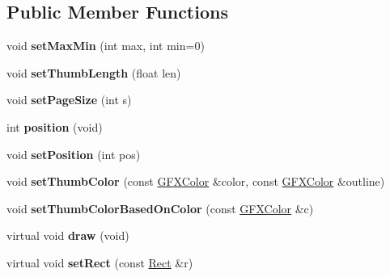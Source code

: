 \subsection*{Public Member Functions}
\begin{DoxyCompactItemize}
\item 
void {\bfseries set\+Max\+Min} (int max, int min=0)\hypertarget{classSlider_a3dc7c04fc2a84a6147ce0a4eaf4a548e}{}\label{classSlider_a3dc7c04fc2a84a6147ce0a4eaf4a548e}

\item 
void {\bfseries set\+Thumb\+Length} (float len)\hypertarget{classSlider_a3c8449732a5e30e1a00ff884ab9ccfa0}{}\label{classSlider_a3c8449732a5e30e1a00ff884ab9ccfa0}

\item 
void {\bfseries set\+Page\+Size} (int s)\hypertarget{classSlider_a35154f532e345746c99298fa19f9b0a2}{}\label{classSlider_a35154f532e345746c99298fa19f9b0a2}

\item 
int {\bfseries position} (void)\hypertarget{classSlider_a10b896097dbdb0483b11fbc0d9ceb83e}{}\label{classSlider_a10b896097dbdb0483b11fbc0d9ceb83e}

\item 
void {\bfseries set\+Position} (int pos)\hypertarget{classSlider_a5de4c8c7734849a48d0daecbcee4bd9b}{}\label{classSlider_a5de4c8c7734849a48d0daecbcee4bd9b}

\item 
void {\bfseries set\+Thumb\+Color} (const \hyperlink{structGFXColor}{G\+F\+X\+Color} \&color, const \hyperlink{structGFXColor}{G\+F\+X\+Color} \&outline)\hypertarget{classSlider_ab3d080b0c11eda79fdbcfb40d61a1e49}{}\label{classSlider_ab3d080b0c11eda79fdbcfb40d61a1e49}

\item 
void {\bfseries set\+Thumb\+Color\+Based\+On\+Color} (const \hyperlink{structGFXColor}{G\+F\+X\+Color} \&c)\hypertarget{classSlider_a54822471dde14fc15317eab11ea50fb7}{}\label{classSlider_a54822471dde14fc15317eab11ea50fb7}

\item 
virtual void {\bfseries draw} (void)\hypertarget{classSlider_a742c3b003bdc8bf76c4215169a007875}{}\label{classSlider_a742c3b003bdc8bf76c4215169a007875}

\item 
virtual void {\bfseries set\+Rect} (const \hyperlink{classRect}{Rect} \&r)\hypertarget{classSlider_a7cdbb79bcde3d79a7a37e161f77936cb}{}\label{classSlider_a7cdbb79bcde3d79a7a37e161f77936cb}


\end{DoxyCompactItemize}
